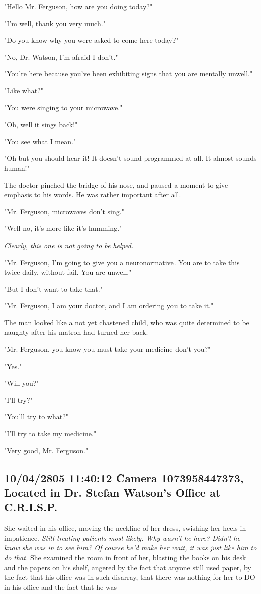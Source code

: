 \documentclass[12pt]{article}
\begin{document}
"Hello Mr. Ferguson, how are you doing today?"

"I'm well, thank you very much."

"Do you know why you were asked to come here today?"

"No, Dr. Watson, I'm afraid I don't."

"You're here because you've been exhibiting signs that you are mentally unwell."

"Like what?"

"You were singing to your microwave."

"Oh, well it sings back!"

"You see what I mean."

"Oh but you should hear it! It doesn't sound programmed at all. It almost sounds human!"

The doctor pinched the bridge of his nose, and paused a moment to give emphasis to his words. He was rather important after all.

"Mr. Ferguson, microwaves don't sing."

"Well no, it's more like it's humming."

\emph{Clearly, this one is not going to be helped.}

"Mr. Ferguson, I'm going to give you a neuronormative. You are to take this twice daily, without fail. You are unwell."

"But I don't want to take that."

"Mr. Ferguson, I am your doctor, and I am ordering you to take it."

The man looked like a not yet chastened child, who was quite determined to be naughty after his matron had turned her back.

"Mr. Ferguson, you know you must take your medicine don't you?"

"Yes."

"Will you?"

"I'll try?"

"You'll try to what?"

"I'll try to take my medicine."

"Very good, Mr. Ferguson."

\subsection*{10/04/2805 11:40:12 Camera 1073958447373, Located in Dr. Stefan Watson's Office at C.R.I.S.P.}
\label{sec:org60265f5}

She waited in his office, moving the neckline of her dress, swishing her heels in impatience. \emph{Still treating patients most likely. Why wasn't he here? Didn't he know she was in to see him? Of course he'd make her wait, it was just like him to do that.} She examined the room in front of her, blasting the books on his desk and the papers on his shelf, angered by the fact that anyone still used paper, by the fact that his office was in such disarray, that there was nothing for her to DO in his office and the fact that he was
\end{document}
